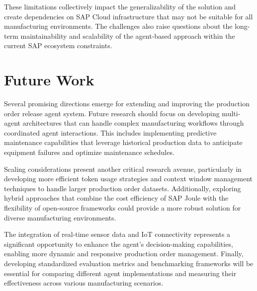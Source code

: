 These limitations collectively impact the generalizability of the solution and create dependencies on SAP Cloud infrastructure that may not be suitable for all manufacturing environments. The challenges also raise questions about the long-term maintainability and scalability of the agent-based approach within the current SAP ecosystem constraints.

\section{Future Work}

Several promising directions emerge for extending and improving the production order release agent system. Future research should focus on developing multi-agent architectures that can handle complex manufacturing workflows through coordinated agent interactions. This includes implementing predictive maintenance capabilities that leverage historical production data to anticipate equipment failures and optimize maintenance schedules.

Scaling considerations present another critical research avenue, particularly in developing more efficient token usage strategies and context window management techniques to handle larger production order datasets. Additionally, exploring hybrid approaches that combine the cost efficiency of SAP Joule with the flexibility of open-source frameworks could provide a more robust solution for diverse manufacturing environments.

The integration of real-time sensor data and IoT connectivity represents a significant opportunity to enhance the agent's decision-making capabilities, enabling more dynamic and responsive production order management. Finally, developing standardized evaluation metrics and benchmarking frameworks will be essential for comparing different agent implementations and measuring their effectiveness across various manufacturing scenarios.